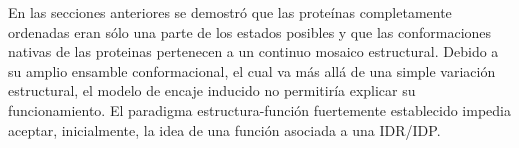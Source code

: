 





En las secciones anteriores se demostró que las proteínas completamente ordenadas eran sólo una parte de los estados posibles y que las conformaciones nativas de las proteinas pertenecen a un continuo mosaico estructural.
Debido a su amplio ensamble conformacional, el cual va más allá de una simple variación estructural, el modelo de encaje inducido no permitiría explicar su funcionamiento.
El paradigma estructura-función fuertemente establecido impedia aceptar, inicialmente, la idea de una función asociada a una IDR/IDP. 

